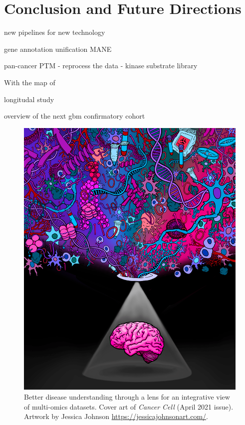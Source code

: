\chapter{Conclusion and Future Directions}
\label{chap:conclusion}

new pipelines for new technology

gene annotation unification MANE

pan-cancer PTM
- reprocess the data
- kinase substrate library



With the map of 

longitudal study

overview of the next gbm confirmatory cohort

\begin{figure}[tb]
    \centering
    \includegraphics[width=0.6\linewidth]{figures/chap05_conclusion/cptac_gbm_cancer_cell_cover.png}
    \caption[Better disease understanding through a lens for an integrative view of multi-omics datasets.]{Better disease understanding through a lens for an integrative view of multi-omics datasets. Cover art of \textit{Cancer Cell} (April 2021 issue). Artwork by Jessica Johnson \url{https://jessicajohnsonart.com/}.}
    \label{fig:lens-multi-omics}
\end{figure}


